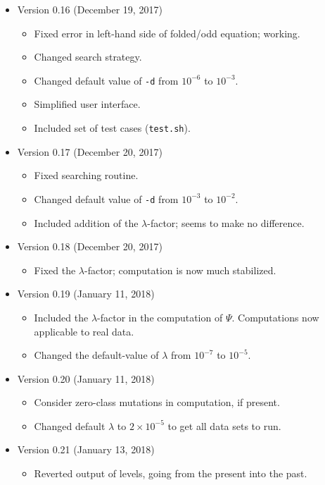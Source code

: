 \documentclass[a4paper]{article}
\newcommand{\ty}{\texttt}
\begin{document}
\begin{itemize}
\item Version 0.16 (December 19, 2017)
  \begin{itemize}
  \item Fixed error in left-hand side of folded/odd equation; working.
  \item Changed search strategy.
  \item Changed default value of \ty{-d} from $10^{-6}$ to $10^{-3}$.
  \item Simplified user interface.
  \item Included set of test cases (\ty{test.sh}).
  \end{itemize}
  \item Version 0.17 (December 20, 2017)
  \begin{itemize}
  \item Fixed searching routine.
  \item Changed default value of \ty{-d} from $10^{-3}$ to $10^{-2}$.
  \item Included addition of the $\lambda$-factor; seems to make no difference.
  \end{itemize}
\item Version 0.18 (December 20, 2017)
  \begin{itemize}
  \item Fixed the $\lambda$-factor; computation is now much
    stabilized.
  \end{itemize}
\item Version 0.19 (January 11, 2018)
  \begin{itemize}
  \item Included the $\lambda$-factor in the computation of
    $\Psi$. Computations now applicable to real data.
  \item Changed the default-value of $\lambda$ from $10^{-7}$ to $10^{-5}$.
  \end{itemize}
\item Version 0.20 (January 11, 2018)
  \begin{itemize}
  \item Consider zero-class mutations in computation, if present.
  \item Changed default $\lambda$ to $2\times 10^{-5}$ to get all data
    sets to run.
  \end{itemize}
\item Version 0.21 (January 13, 2018)
  \begin{itemize}
    \item Reverted output of levels, going from the present into the
      past.

\end{itemize}
\end{itemize}
\end{document}
